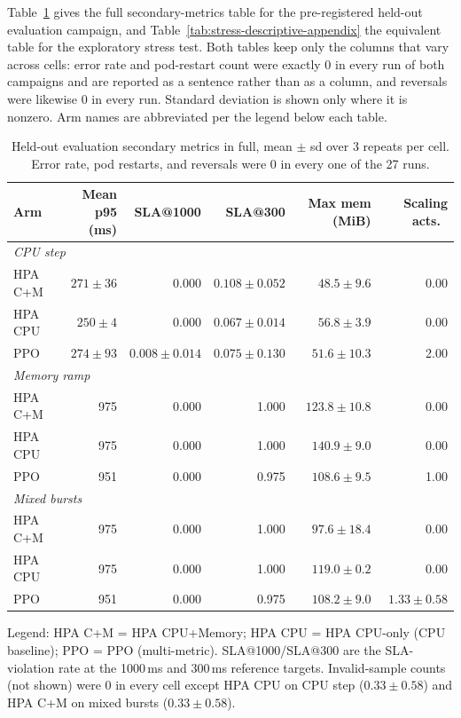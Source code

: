 Table~\ref{tab:eval-secondary-appendix} gives the full secondary-metrics
table for the pre-registered held-out evaluation campaign, and
Table~\ref{tab:stress-descriptive-appendix} the equivalent table for the
exploratory stress test. Both tables keep only the columns that vary
across cells: error rate and pod-restart count were exactly 0 in every
run of both campaigns and are reported as a sentence rather than as a
column, and reversals were likewise 0 in every run. Standard deviation is
shown only where it is nonzero. Arm names are abbreviated per the legend
below each table.

\begin{table}[H]
\centering
\caption[Held-out evaluation, full secondary metrics]{Held-out evaluation secondary metrics in full, mean $\pm$ sd over 3 repeats per cell. Error rate, pod restarts, and reversals were 0 in every one of the 27 runs.}
\label{tab:eval-secondary-appendix}
\small
\begin{tabular}{lrrrrr}
\toprule
Arm & Mean p95 (ms) & SLA@1000 & SLA@300 & Max mem (MiB) & Scaling acts.\ \\
\midrule
\multicolumn{6}{l}{\textit{CPU step}} \\
HPA C+M & $271 \pm 36$ & 0.000 & $0.108 \pm 0.052$ & $48.5 \pm 9.6$ & 0.00 \\
HPA CPU & $250 \pm 4$ & 0.000 & $0.067 \pm 0.014$ & $56.8 \pm 3.9$ & 0.00 \\
PPO & $274 \pm 93$ & $0.008 \pm 0.014$ & $0.075 \pm 0.130$ & $51.6 \pm 10.3$ & 2.00 \\
\midrule
\multicolumn{6}{l}{\textit{Memory ramp}} \\
HPA C+M & 975 & 0.000 & 1.000 & $123.8 \pm 10.8$ & 0.00 \\
HPA CPU & 975 & 0.000 & 1.000 & $140.9 \pm 9.0$ & 0.00 \\
PPO & 951 & 0.000 & 0.975 & $108.6 \pm 9.5$ & 1.00 \\
\midrule
\multicolumn{6}{l}{\textit{Mixed bursts}} \\
HPA C+M & 975 & 0.000 & 1.000 & $97.6 \pm 18.4$ & 0.00 \\
HPA CPU & 975 & 0.000 & 1.000 & $119.0 \pm 0.2$ & 0.00 \\
PPO & 951 & 0.000 & 0.975 & $108.2 \pm 9.0$ & $1.33 \pm 0.58$ \\
\bottomrule
\end{tabular}

\vspace{4pt}
\footnotesize Legend: HPA C+M = HPA CPU+Memory; HPA CPU = HPA CPU-only (CPU baseline); PPO = PPO (multi-metric). SLA@1000/SLA@300 are the SLA-violation rate at the 1000\,ms and 300\,ms reference targets. Invalid-sample counts (not shown) were 0 in every cell except HPA CPU on CPU step ($0.33\pm0.58$) and HPA C+M on mixed bursts ($0.33\pm0.58$).
\end{table}

